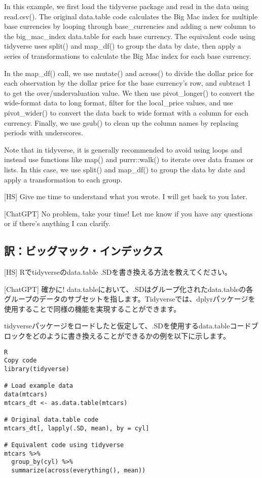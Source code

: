 \documentclass[
]{book}
\theoremstyle{definition}
\theoremstyle{definition}
\theoremstyle{definition}
\theoremstyle{definition}
\theoremstyle{remark}
\begin{document}
In this example, we first load the tidyverse package and read in the data using read.csv(). The original data.table code calculates the Big Mac index for multiple base currencies by looping through base\_currencies and adding a new column to the big\_mac\_index data.table for each base currency. The equivalent code using tidyverse uses split() and map\_df() to group the data by date, then apply a series of transformations to calculate the Big Mac index for each base currency.

In the map\_df() call, we use mutate() and across() to divide the dollar price for each observation by the dollar price for the base currency's row, and subtract 1 to get the over/undervaluation value. We then use pivot\_longer() to convert the wide-format data to long format, filter for the local\_price values, and use pivot\_wider() to convert the data back to wide format with a column for each currency. Finally, we use gsub() to clean up the column names by replacing periods with underscores.

Note that in tidyverse, it is generally recommended to avoid using loops and instead use functions like map() and purrr::walk() to iterate over data frames or lists. In this case, we use split() and map\_df() to group the data by date and apply a transformation to each group.

{[}HS{]} Give me time to understand what you wrote. I will get back to you later.

{[}ChatGPT{]} No problem, take your time! Let me know if you have any questions or if there's anything I can clarify.

\hypertarget{bigmacindexj}{%
\subsection{訳：ビッグマック・インデックス}\label{bigmacindexj}}

{[}HS{]} Rでtidyverseのdata.table .SDを書き換える方法を教えてください。

{[}ChatGPT{]} 確かに! data.tableにおいて、.SDはグループ化されたdata.tableの各グループのデータのサブセットを指します。Tidyverseでは、dplyrパッケージを使用することで同様の機能を実現することができます。

tidyverseパッケージをロードしたと仮定して、.SDを使用するdata.tableコードブロックをどのように書き換えることができるかの例を以下に示します。

\begin{verbatim}
R
Copy code
library(tidyverse)

# Load example data
data(mtcars)
mtcars_dt <- as.data.table(mtcars)

# Original data.table code
mtcars_dt[, lapply(.SD, mean), by = cyl]

# Equivalent code using tidyverse
mtcars %>%
  group_by(cyl) %>%
  summarize(across(everything(), mean))
\end{verbatim}
\end{document}
